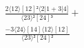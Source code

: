\documentclass[varwidth, border=5pt]{standalone}
\begin{document}
\begin{my}
$\begin{gathered}
\scriptscriptstyle\frac{2⟨12⟩[12]²⟨2|1+3|4]}{⟨23⟩²[24]³} +\\
\scriptscriptstyle\frac{-3⟨24⟩[14]⟨12⟩[12]}{⟨23⟩²[24]²} \phantom{+}
\end{gathered}$
\end{my}
\end{document}
